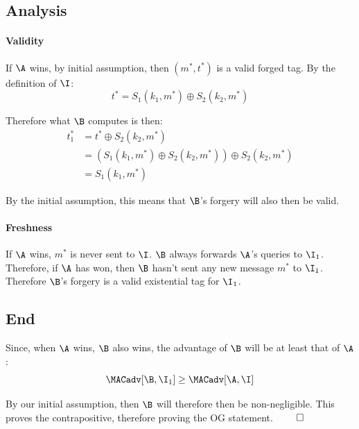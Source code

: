 \documentclass[12pt]{article}
\newif\ifsol
\begin{document}
\begin{solution}
\subsection*{Analysis}
\paragraph{Validity} If $\A$ wins, by initial assumption, then $(m^*, t^*)$ is a valid forged tag. By the definition of $\I$:
\begin{equation*}
    t^* = S_1(k_1, m^*) \oplus S_2(k_2, m^*)
\end{equation*}

\noindent Therefore what $\B$ computes is then:
\begin{equation*}
    \begin{aligned}
        t^*_1 &= t^* \oplus S_2(k_2, m^*)\\
        &= (S_1(k_1, m^*) \oplus S_2(k_2, m^*)) \oplus S_2(k_2, m^*)\\
        &= S_1(k_1, m^*)
    \end{aligned}
\end{equation*}

\noindent By the initial assumption, this means that $\B$'s forgery will also then be valid.

\paragraph{Freshness} If $\A$ wins, $m^*$ is never sent to $\I$. $\B$ always forwards $\A$'s queries to $\I_1$. Therefore, if $\A$ has won, then $\B$ hasn't
sent any new message $m^*$ to $\I_1$. Therefore $\B$'s forgery is a valid existential tag for $\I_1$.

\subsection*{End}
Since, when $\A$ wins, $\B$ also wins, the advantage of $\B$ will be at least that of $\A$:
\begin{equation*}
    \MACadv[\B, \I_1] \geq \MACadv[\A, \I] 
\end{equation*}

\noindent By our initial assumption, then $\B$ will therefore then be non-negligible. This proves the contrapositive, therefore proving the OG statement. $\qed$
\end{solution}



\ifsol\else\newpage\fi
\end{document}
